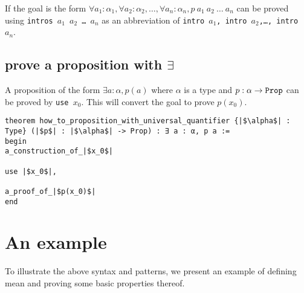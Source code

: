 \documentclass{report}
\theoremstyle{definition}
\theoremstyle{plain}
\begin{document}
If the goal is the form $\forall a_1:\alpha_1,\forall a_2:\alpha_2,\dots,\forall a_n:\alpha_n, p\ a_1\ a_2\ \dots\ a_n$ can be proved using {\tt intros $a_1$ $a_2$ \dots\  $a_n$} as an abbreviation of {\tt intro $a_1$, intro $a_2$,\dots, intro $a_n$}.

\subsection{prove a proposition with $\exists$}\label{lean:exists}
A proposition of the form $\exists a:\alpha, p(a)$ where $\alpha$ is a type and $p : \alpha\to {\tt Prop}$ can be proved by {\tt use $x_0$}. This will convert the goal to prove $p(x_0)$.

\begin{verbatim}
theorem how_to_proposition_with_universal_quantifier {|$\alpha$| : Type} (|$p$| : |$\alpha$| -> Prop) : ∃ a : α, p a :=
begin
a_construction_of_|$x_0$|

use |$x_0$|,
  
a_proof_of_|$p(x_0)$|
end
\end{verbatim}


\section{An example}
To illustrate the above syntax and patterns, we present an example of defining mean and proving some basic properties thereof.
\end{document}
